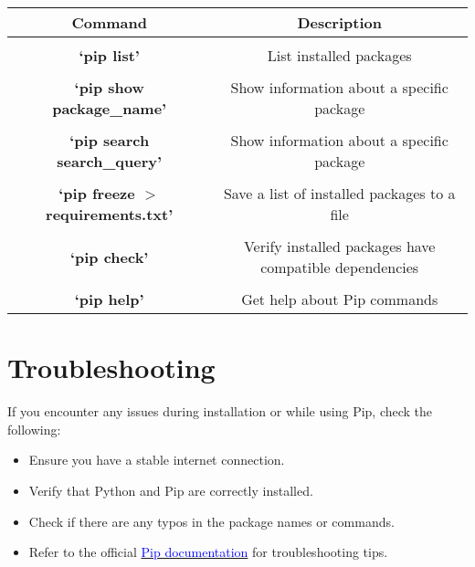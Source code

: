 \documentclass[a4paper, 12pt]{report}
\begin{document}
        \begin{tcolorbox}[colback=white, colframe=black, rounded corners]
        \small
        \begin{tabular}{c|c}
        
             \\[2pt] \textbf{Command} & \textbf{Description} \\[15pt]
             \hline
             
             \\[1pt] \textbf{`pip list'} & List installed packages \\[10pt]
             \hline
             
             \\[1pt]\textbf{`pip show package\_name'} & Show information about a specific package \\[10pt]
             \hline

             \\[1pt]\textbf{`pip search search\_query'} & Show information about a specific package \\[10pt]
             \hline

             \\[1pt]\textbf{`pip freeze $>$ requirements.txt'} & Save a list of installed packages to a file \\[10pt]
             \hline

             \\[1pt] \textbf{`pip check'} & Verify installed packages have compatible dependencies \\[10pt]
             \hline
             
             \\[1pt] \textbf{`pip help'} & Get help about Pip commands \\[10pt]
             
        \end{tabular}
        \end{tcolorbox}

    
    \section{Troubleshooting}
        If you encounter any issues during installation or while using Pip, check the following:
        
        \begin{itemize}
            \item Ensure you have a stable internet connection.
            \item Verify that Python and Pip are correctly installed.
            \item Check if there are any typos in the package names or commands.
            \item Refer to the official \href{https://pip.pypa.io/en/stable/}{\textcolor{blue}{Pip documentation}} for troubleshooting tips.
        \end{itemize}
    
\end{document}
